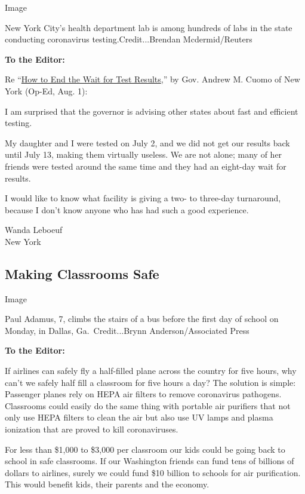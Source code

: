 Image

New York City's health department lab is among hundreds of labs in the
state conducting coronavirus testing.Credit...Brendan Mcdermid/Reuters

\textbf{To the Editor:}

Re
``\href{https://www.nytimes.com/2020/07/31/opinion/coronavirus-testing-cuomo.html}{How
to End the Wait for Test Results},'' by Gov. Andrew M. Cuomo of New York
(Op-Ed, Aug. 1):

I am surprised that the governor is advising other states about fast and
efficient testing.

My daughter and I were tested on July 2, and we did not get our results
back until July 13, making them virtually useless. We are not alone;
many of her friends were tested around the same time and they had an
eight-day wait for results.

I would like to know what facility is giving a two- to three-day
turnaround, because I don't know anyone who has had such a good
experience.

Wanda Leboeuf\\
New York

\hypertarget{making-classrooms-safe}{%
\subsection{Making Classrooms Safe}\label{making-classrooms-safe}}

Image

Paul Adamus, 7, climbs the stairs of a bus before the first day of
school on Monday, in Dallas, Ga.~Credit...Brynn Anderson/Associated
Press

\textbf{To the Editor:}

If airlines can safely fly a half-filled plane across the country for
five hours, why can't we safely half fill a classroom for five hours a
day? The solution is simple: Passenger planes rely on HEPA air filters
to remove coronavirus pathogens. Classrooms could easily do the same
thing with portable air purifiers that not only use HEPA filters to
clean the air but also use UV lamps and plasma ionization that are
proved to kill coronaviruses.

For less than \$1,000 to \$3,000 per classroom our kids could be going
back to school in safe classrooms. If our Washington friends can fund
tens of billions of dollars to airlines, surely we could fund \$10
billion to schools for air purification. This would benefit kids, their
parents and the economy.

